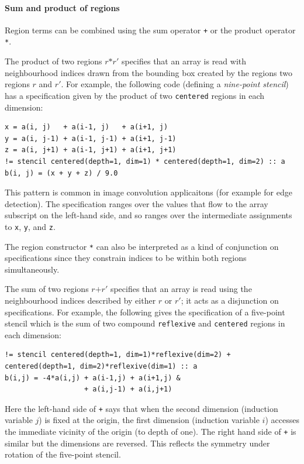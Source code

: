 \documentclass[9pt,preprint]{sigplanconf}
\theoremstyle{definition}
\newcommand{\term}[1]{\texttt{#1}}
\begin{document}
\paragraph{Sum and product of regions}
Region terms can be combined using the sum operator
\term{+} or the product operator \term{*}.

The product of two regions $r \texttt{*} r'$ specifies that an array
is read with neighbourhood indices drawn from the bounding box created
by the regions two regions $r$ and $r'$. For example, the following
code (defining a \emph{nine-point stencil}) has a specification given by the
product of two \texttt{centered} regions in each dimension:
\begin{verbatim}
x = a(i, j)   + a(i-1, j)   + a(i+1, j)
y = a(i, j-1) + a(i-1, j-1) + a(i+1, j-1)
z = a(i, j+1) + a(i-1, j+1) + a(i+1, j+1)
!= stencil centered(depth=1, dim=1) * centered(depth=1, dim=2) :: a
b(i, j) = (x + y + z) / 9.0
\end{verbatim}
This pattern is common in image convolution applicaitons (for example
for edge detection). The specification ranges over the
values that flow to the array subscript on the left-hand side,
and so ranges over the intermediate assignments to \term{x},
\term{y}, and \term{z}.

The region constructor \texttt{*} can also be interpreted as a
kind of conjunction on specifications since they constrain
indices to be within both regions simultaneously.

The sum of two regions $r \texttt{+} r'$ specifies that an array is
read using the neighbourhood indices described by either $r$ or
$r'$; it acts as a disjunction on specifications. For
example, the following gives the specification of a five-point
stencil which is the sum of two compound \texttt{reflexive} and
\texttt{centered} regions in each dimension:
\begin{verbatim}
!= stencil centered(depth=1, dim=1)*reflexive(dim=2) + centered(depth=1, dim=2)*reflexive(dim=1) :: a
b(i,j) = -4*a(i,j) + a(i-1,j) + a(i+1,j) &
                   + a(i,j-1) + a(i,j+1)
\end{verbatim}
Here the left-hand side of \texttt{+} says that when the second dimension
(induction variable $j$) is fixed at the origin, the first dimension
(induction variable $i$) accesses the immediate vicinity of the origin
(to depth of one). The right hand side of \texttt{+} is similar but the dimensions are reversed.
This reflects the symmetry under rotation of the five-point stencil.
\end{document}
